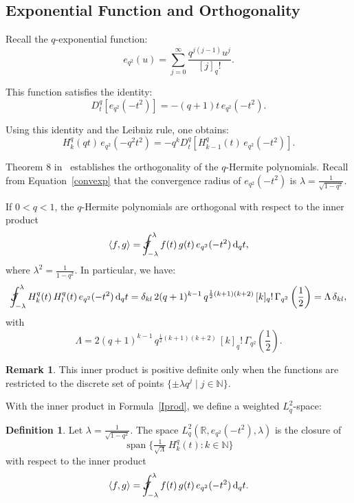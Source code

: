 \documentclass[10pt]{amsart}
\theoremstyle{plain}
\theoremstyle{definition}
\newtheorem{definition}[theorem]{Definition}
\newtheorem{remark}[theorem]{Remark}
\newcommand{\Jint}{\mathcal{J}\mspace{-20mu}\int  }
\begin{document}
\subsection{Exponential Function and Orthogonality}
Recall the $q$-exponential function:
\[
e_{q^2}(u) = \sum_{j=0}^\infty \frac{q^{j(j-1)} u^j}{[j]_q!}.
\]

This function satisfies the identity:
\[
D_t^q \left[ e_{ q^2}(-t^2) \right] = -(q+1)t\, e_{q^2}(-t^2).
\]

Using this identity and the Leibniz rule, one obtains:
$$
H_k^q(qt)\, e_{q^2}(-q^2 t^2) = -q^k D_t^q \left[ H_{k-1}^q(t)\, e_{q^2}(-t^2) \right].
$$


Theorem 8 in~\cite{CoSo2010} establishes the orthogonality of the $q$-Hermite polynomials. Recall from Equation~\eqref{convexp} that the convergence radius of $ e_{q^2}(-t^2) $ is $ \lambda = \frac{1}{\sqrt{1 - q^2}} $.

If $ 0 < q < 1 $, the $q$-Hermite polynomials are orthogonal with respect to the inner product
\begin{equation}\label{Iprod}
\langle f, g \rangle = \Jint_{-\lambda}^{\lambda} f(t)\, g(t)\, e_{q^2}(-t^2)\, \mathrm{d}_q t,
\end{equation}
where $ \lambda^2 = \frac{1}{1 - q^2} $. In particular, we have:
\begin{equation}\label{ForLambda}
\Jint_{-\lambda}^{\lambda} H_k^q(t)\, H_l^q(t)\, e_{q^2}(-t^2)\, \mathrm{d}_q t = \delta_{kl}\, 2(q+1)^{k-1}\, q^{\frac{1}{2}(k+1)(k+2)}\, [k]_q!\, \Gamma_{q^2}\left( \frac{1}{2} \right) = \Lambda\, \delta_{kl},
\end{equation}
with
\begin{equation}\label{biglambda}
\Lambda = 2(q+1)^{k-1}\, q^{\frac{1}{2}(k+1)(k+2)}\, [k]_q!\, \Gamma_{q^2}\left( \frac{1}{2} \right).
\end{equation}




\begin{remark}
This inner product is positive definite only when the functions are restricted to the discrete set of points $ \{ \pm \lambda q^j \mid j \in \mathbb{N} \} $.
\end{remark}


With the inner product in Formula~\eqref{Iprod}, we define a weighted  $L_q^2$-space:
\begin{definition}%
Let $\lambda=\frac{1}{\sqrt{1-q^2}}$. The space
$L^2_q(\mathbb{R},e_{q^2}(-t^2),\lambda)$ is the closure of
\[
\operatorname{span}\Big\{\tfrac{1}{\sqrt{\Lambda}}\,H_k^q(t):k\in\mathbb{N}\Big\}
\]
with respect to the inner product
\[
\langle f,g\rangle=\Jint_{-\lambda}^{\lambda} f(t)\,g(t)\,e_{q^2}(-t^2)\,\mathrm{d}_q t.
\]
\end{definition}
\end{document}
